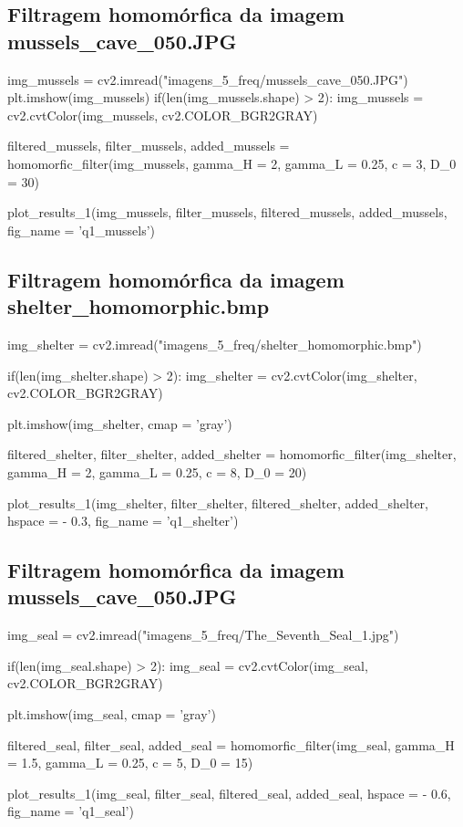 \documentclass{article}
\begin{document}
\newpage

\subsection{Filtragem homomórfica da imagem mussels\_cave\_050.JPG}
\label{cod:mussels}
\begin{python}img_mussels = cv2.imread("imagens_5_freq/mussels_cave_050.JPG")
	plt.imshow(img_mussels)
	if(len(img_mussels.shape) > 2):
		img_mussels = cv2.cvtColor(img_mussels, cv2.COLOR_BGR2GRAY)
		
		
filtered_mussels, filter_mussels, added_mussels = homomorfic_filter(img_mussels, 
gamma_H = 2, gamma_L = 0.25, c = 3, D_0 = 30)

plot_results_1(img_mussels, 
					filter_mussels, 
					filtered_mussels, 
					added_mussels, 
					fig_name = 'q1_mussels')
\end{python}


\subsection{Filtragem homomórfica da imagem shelter\_homomorphic.bmp}
\label{cod:shelter}
\begin{python}
img_shelter = cv2.imread("imagens_5_freq/shelter_homomorphic.bmp")

if(len(img_shelter.shape) > 2):
	img_shelter = cv2.cvtColor(img_shelter, cv2.COLOR_BGR2GRAY)
	
plt.imshow(img_shelter, cmap = 'gray')

filtered_shelter, filter_shelter, added_shelter = homomorfic_filter(img_shelter, 
gamma_H = 2, gamma_L = 0.25, c = 8, D_0 = 20)

plot_results_1(img_shelter, 
				filter_shelter, 
				filtered_shelter, 
				added_shelter,
				hspace = - 0.3,
				fig_name = 'q1_shelter')
\end{python}

\subsection{Filtragem homomórfica da imagem mussels\_cave\_050.JPG}
\label{cod:seal}
\begin{python}
img_seal = cv2.imread("imagens_5_freq/The_Seventh_Seal_1.jpg")

if(len(img_seal.shape) > 2):
	img_seal = cv2.cvtColor(img_seal, cv2.COLOR_BGR2GRAY)

plt.imshow(img_seal, cmap = 'gray')

filtered_seal, filter_seal, added_seal = homomorfic_filter(img_seal, 
gamma_H = 1.5, gamma_L = 0.25, c = 5, D_0 = 15)

plot_results_1(img_seal, 
filter_seal, 
filtered_seal, 
added_seal,
hspace = - 0.6,
fig_name = 'q1_seal')
\end{python}
\end{document}
